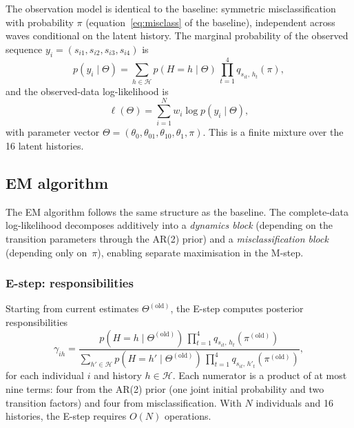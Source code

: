 The observation model is identical to the baseline: symmetric
misclassification with probability $\pi$ (equation~\eqref{eq:misclass}
of the baseline), independent across waves conditional on the latent
history. The marginal probability of the observed sequence
$y_i = (s_{i1}, s_{i2}, s_{i3}, s_{i4})$ is
\begin{equation}
p(y_i \mid \Theta) = \sum_{h \in \mathcal{H}}
  p(H = h \mid \Theta)\,
  \prod_{t=1}^{4} q_{s_{it},\, h_t}(\pi),
\label{eq:ar2_marginal}
\end{equation}
and the observed-data log-likelihood is
\begin{equation}
\ell(\Theta) = \sum_{i=1}^{N} w_i \log p(y_i \mid \Theta),
\label{eq:ar2_obs_ll}
\end{equation}
with parameter vector
$\Theta = (\theta_0, \theta_{01}, \theta_{10}, \theta_1, \pi)$.
This is a finite mixture over the 16 latent histories.

\subsection{EM algorithm}
\label{sec:ar2_em}

The EM algorithm follows the same structure as the baseline. The
complete-data log-likelihood decomposes additively into a
\emph{dynamics block} (depending on the transition parameters through
the AR(2) prior) and a \emph{misclassification block} (depending only
on~$\pi$), enabling separate maximisation in the M-step.

\subsubsection{E-step: responsibilities}

Starting from current estimates $\Theta^{(\mathrm{old})}$, the E-step
computes posterior responsibilities
\begin{equation}
\gamma_{ih} = \frac{
  p(H = h \mid \Theta^{(\mathrm{old})})\,
  \prod_{t=1}^{4} q_{s_{it},\, h_t}(\pi^{(\mathrm{old})})
}{
  \sum_{h' \in \mathcal{H}}
  p(H = h' \mid \Theta^{(\mathrm{old})})\,
  \prod_{t=1}^{4} q_{s_{it},\, h'_t}(\pi^{(\mathrm{old})})
},
\label{eq:ar2_responsibility}
\end{equation}
for each individual $i$ and history $h \in \mathcal{H}$.
Each numerator is a product of at most nine terms: four from the AR(2)
prior (one joint initial probability and two transition factors) and
four from misclassification. With $N$ individuals and 16 histories, the
E-step requires $O(N)$ operations.


